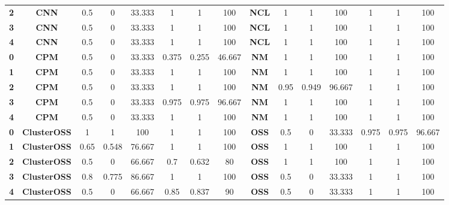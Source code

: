 {{\begin{tabular}{c|c|cccccc|ccccccc}
\textbf{2} & \textbf{CNN} & 0.5   & 0     & 33.333 & 1     & 1     & 100   & \multicolumn{1}{c|}{\textbf{NCL}} & 1     & 1     & 100   & 1     & 1     & 100 \\
\textbf{3} & \textbf{CNN} & 0.5   & 0     & 33.333 & 1     & 1     & 100   & \multicolumn{1}{c|}{\textbf{NCL}} & 1     & 1     & 100   & 1     & 1     & 100 \\
\textbf{4} & \textbf{CNN} & 0.5   & 0     & 33.333 & 1     & 1     & 100   & \multicolumn{1}{c|}{\textbf{NCL}} & 1     & 1     & 100   & 1     & 1     & 100 \\
\textbf{0} & \textbf{CPM} & 0.5   & 0     & 33.333 & 0.375 & 0.255 & 46.667 & \multicolumn{1}{c|}{\textbf{NM}} & 1     & 1     & 100   & 1     & 1     & 100 \\
\textbf{1} & \textbf{CPM} & 0.5   & 0     & 33.333 & 1     & 1     & 100   & \multicolumn{1}{c|}{\textbf{NM}} & 1     & 1     & 100   & 1     & 1     & 100 \\
\textbf{2} & \textbf{CPM} & 0.5   & 0     & 33.333 & 1     & 1     & 100   & \multicolumn{1}{c|}{\textbf{NM}} & 0.95  & 0.949 & 96.667 & 1     & 1     & 100 \\
\textbf{3} & \textbf{CPM} & 0.5   & 0     & 33.333 & 0.975 & 0.975 & 96.667 & \multicolumn{1}{c|}{\textbf{NM}} & 1     & 1     & 100   & 1     & 1     & 100 \\
\textbf{4} & \textbf{CPM} & 0.5   & 0     & 33.333 & 1     & 1     & 100   & \multicolumn{1}{c|}{\textbf{NM}} & 1     & 1     & 100   & 1     & 1     & 100 \\
\textbf{0} & \textbf{ClusterOSS} & 1     & 1     & 100   & 1     & 1     & 100   & \multicolumn{1}{c|}{\textbf{OSS}} & 0.5   & 0     & 33.333 & 0.975 & 0.975 & 96.667 \\
\textbf{1} & \textbf{ClusterOSS} & 0.65  & 0.548 & 76.667 & 1     & 1     & 100   & \multicolumn{1}{c|}{\textbf{OSS}} & 1     & 1     & 100   & 1     & 1     & 100 \\
\textbf{2} & \textbf{ClusterOSS} & 0.5   & 0     & 66.667 & 0.7   & 0.632 & 80    & \multicolumn{1}{c|}{\textbf{OSS}} & 1     & 1     & 100   & 1     & 1     & 100 \\
\textbf{3} & \textbf{ClusterOSS} & 0.8   & 0.775 & 86.667 & 1     & 1     & 100   & \multicolumn{1}{c|}{\textbf{OSS}} & 0.5   & 0     & 33.333 & 1     & 1     & 100 \\
\textbf{4} & \textbf{ClusterOSS} & 0.5   & 0     & 66.667 & 0.85  & 0.837 & 90    & \multicolumn{1}{c|}{\textbf{OSS}} & 0.5   & 0     & 33.333 & 1     & 1     & 100 \\

\end{tabular}}}
